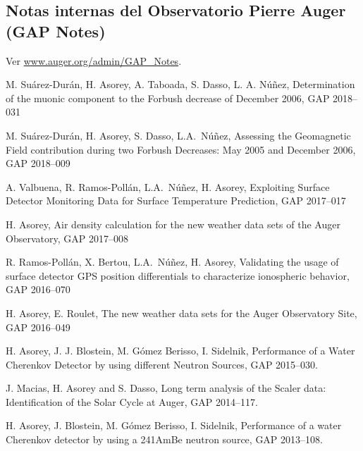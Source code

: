 \subsection*{Notas internas del Observatorio Pierre Auger (GAP Notes)}

Ver \href{http://www.auger.org/admin-cgi-bin/woda/gap\_notes.pl/Search?search=asorey}{www.auger.org/admin/GAP\_Notes}.
\fi

\noindent
\begin{etaremune}

\item {} M. Suárez-Durán, H. Asorey, A. Taboada, S. Dasso, L. A. Núñez, {{Determination of the muonic component to the Forbush decrease of December 2006}}, GAP 2018--031

\item {} M. Suárez-Durán, H. Asorey, S. Dasso, L.A.\ Núñez, {{Assessing the Geomagnetic Field contribution during two Forbush Decreases: May 2005 and December 2006}}, GAP 2018--009

\item {} A. Valbuena, R. Ramos-Pollán, L.A.\ Núñez, H. Asorey, {{Exploiting Surface Detector Monitoring Data for Surface Temperature Prediction}}, GAP 2017--017

\item {} H. Asorey, {{Air density calculation for the new weather data sets of the Auger Observatory}}, GAP 2017--008

\item {} R. Ramos-Pollán, X. Bertou, L.A.\ Núñez, H. Asorey, {{Validating the usage of surface detector GPS position differentials to characterize ionospheric behavior}}, GAP 2016--070

\item {} H. Asorey, E. Roulet, {{The new weather data sets for the Auger Observatory Site}}, GAP 2016--049

\item {} H. Asorey, J. J. Blostein, M. Gómez Berisso, I. Sidelnik, {{Performance of a Water Cherenkov Detector by using different Neutron Sources}}, GAP 2015--030.

\item {} J. Macias, H. Asorey and S. Dasso, {{Long term analysis of the Scaler data: Identification of the Solar Cycle at Auger}}, GAP 2014--117.

\item {} H. Asorey, J. Blostein, M. Gómez Berisso, I. Sidelnik, {{Performance of a water Cherenkov detector by using a 241AmBe neutron source}}, GAP 2013--108.


\end{etaremune}
